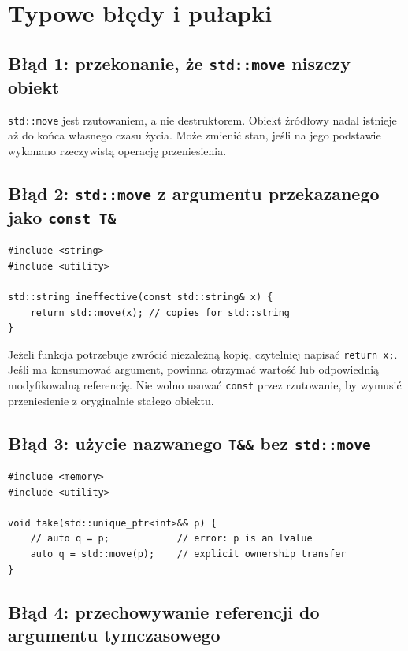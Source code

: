 \section{Typowe błędy i pułapki}
\label{sec:move-errors}

\subsection{Błąd 1: przekonanie, że \texttt{std::move} niszczy obiekt}

\texttt{std::move} jest rzutowaniem, a nie destruktorem. Obiekt
źródłowy nadal istnieje aż do końca własnego czasu życia.
Może zmienić stan, jeśli na jego podstawie wykonano
rzeczywistą operację przeniesienia.

\subsection{Błąd 2: \texttt{std::move} z argumentu przekazanego jako \texttt{const T\&}}

\begin{lstlisting}
#include <string>
#include <utility>

std::string ineffective(const std::string& x) {
    return std::move(x); // copies for std::string
}
\end{lstlisting}

Jeżeli funkcja potrzebuje zwrócić niezależną kopię, czytelniej
napisać \texttt{return x;}. Jeśli ma konsumować argument,
powinna otrzymać wartość lub odpowiednią modyfikowalną
referencję. Nie wolno usuwać \texttt{const} przez rzutowanie,
by wymusić przeniesienie z oryginalnie stałego obiektu.

\subsection{Błąd 3: użycie nazwanego \texttt{T\&\&} bez \texttt{std::move}}

\begin{lstlisting}
#include <memory>
#include <utility>

void take(std::unique_ptr<int>&& p) {
    // auto q = p;            // error: p is an lvalue
    auto q = std::move(p);    // explicit ownership transfer
}
\end{lstlisting}

\subsection{Błąd 4: przechowywanie referencji do argumentu tymczasowego}

